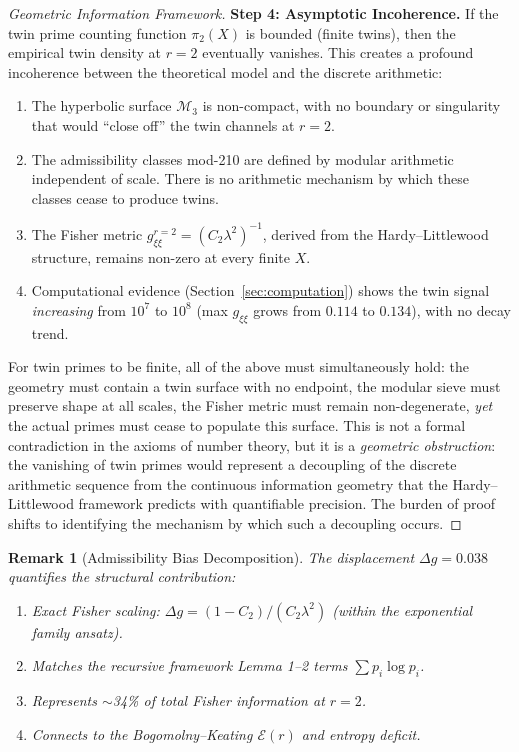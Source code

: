 \documentclass[12pt]{article}
\newtheorem{remark}[theorem]{Remark}
\begin{document}
\begin{proof}[Geometric Information Framework]
\textbf{Step 4: Asymptotic Incoherence.}
If the twin prime counting function $\pi_2(X)$ is bounded (finite twins), then
the empirical twin density at $r=2$ eventually vanishes. This creates a profound
incoherence between the theoretical model and the discrete arithmetic:
\begin{enumerate}
  \item The hyperbolic surface $\mathcal{M}_3$ is non-compact, with no boundary
    or singularity that would ``close off'' the twin channels at $r=2$.
  \item The admissibility classes mod-210 are defined by modular arithmetic
    independent of scale. There is no arithmetic mechanism by which these
    classes cease to produce twins.
  \item The Fisher metric $g_{\xi\xi}^{r=2} = (C_2\lambda^2)^{-1}$, derived
    from the Hardy--Littlewood structure, remains non-zero at every finite $X$.
  \item Computational evidence (Section~\ref{sec:computation}) shows the
    twin signal \textit{increasing} from $10^7$ to $10^8$ (max $g_{\xi\xi}$
    grows from $0.114$ to $0.134$), with no decay trend.
\end{enumerate}
For twin primes to be finite, all of the above must simultaneously hold:
the geometry must contain a twin surface with no endpoint, the modular sieve
must preserve shape at all scales, the Fisher metric must remain non-degenerate,
\textit{yet} the actual primes must cease to populate this surface. This is not
a formal contradiction in the axioms of number theory, but it is a
\textit{geometric obstruction}: the vanishing of twin primes would represent
a decoupling of the discrete arithmetic sequence from the continuous
information geometry that the Hardy--Littlewood framework predicts with
quantifiable precision. The burden of proof shifts to identifying the mechanism
by which such a decoupling occurs.
\end{proof}

\begin{remark}[Admissibility Bias Decomposition]
The displacement $\Delta g = 0.038$ quantifies the structural contribution:
\begin{enumerate}
  \item Exact Fisher scaling: $\Delta g = (1-C_2)/(C_2\lambda^2)$
    (within the exponential family ansatz).
  \item Matches the recursive framework Lemma 1--2 terms $\sum p_i \log p_i$.
  \item Represents $\sim$34\% of total Fisher information at $r=2$.
  \item Connects to the Bogomolny--Keating $\mathcal{E}(r)$ and entropy deficit.
\end{enumerate}
\end{remark}
\end{document}
